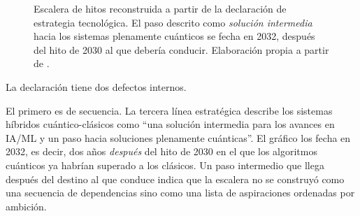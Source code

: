 \documentclass[11pt,letterpaper]{article}
\begin{document}
\begin{figure}[ht]
  \centering
  \caption{Escalera de hitos reconstruida a partir de la declaración de
  estrategia tecnológica. El paso descrito como \emph{solución intermedia}
  hacia los sistemas plenamente cuánticos se fecha en 2032, después del hito de
  2030 al que debería conducir. Elaboración propia a partir de
  \textcite{numa2023}.}
  \label{fig:hitos}
\end{figure}

La declaración tiene dos defectos internos.

El primero es de secuencia. La tercera línea estratégica describe los sistemas
híbridos cuántico-clásicos como \enquote{una solución intermedia para los
avances en IA/ML y un paso hacia soluciones plenamente cuánticas}. El gráfico
los fecha en 2032, es decir, dos años \emph{después} del hito de 2030 en el que
los algoritmos cuánticos ya habrían superado a los clásicos. Un paso intermedio
que llega después del destino al que conduce indica que la escalera no se
construyó como una secuencia de dependencias sino como una lista de
aspiraciones ordenadas por ambición.
\end{document}
